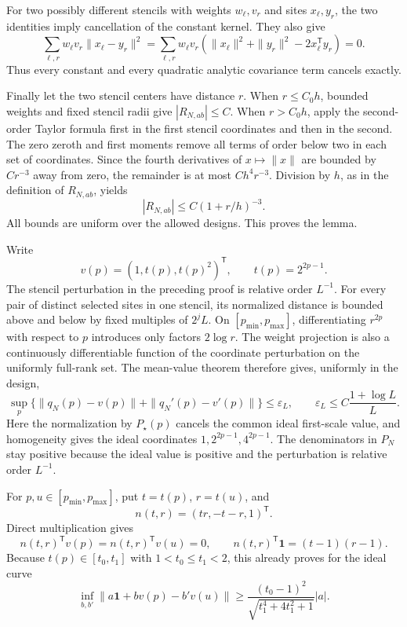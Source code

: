 For two possibly different stencils with weights \(w_\ell,v_r\) and sites \(x_\ell,y_r\), the two identities imply cancellation of the constant kernel.  They also give
\[
 \sum_{\ell,r}w_\ell v_r\|x_\ell-y_r\|^2
 =\sum_{\ell,r}w_\ell v_r
   (\|x_\ell\|^2+\|y_r\|^2-2x_\ell^{\mathsf T}y_r)=0.
\]
Thus every constant and every quadratic analytic covariance term cancels exactly.

Finally let the two stencil centers have distance \(r\).  When \(r\le C_0h\), bounded weights and fixed stencil radii give \(|R_{N,ab}|\le C\).  When \(r>C_0h\), apply the second-order Taylor formula first in the first stencil coordinates and then in the second.  The zero zeroth and first moments remove all terms of order below two in each set of coordinates.  Since the fourth derivatives of \(x\mapsto\|x\|\) are bounded by \(Cr^{-3}\) away from zero, the remainder is at most \(Ch^4r^{-3}\).  Division by \(h\), as in the definition of \(R_{N,ab}\), yields
\[
 |R_{N,ab}|\le C(1+r/h)^{-3}.
\]
All bounds are uniform over the allowed designs.  This proves the lemma.

Write
\[
 v(p)=(1,t(p),t(p)^2)^{\mathsf T},
 \qquad t(p)=2^{2p-1}.
\]
The stencil perturbation in the preceding proof is relative order \(L^{-1}\).  For every pair of distinct selected sites in one stencil, its normalized distance is bounded above and below by fixed multiples of \(2^jL\).  On \([p_{\min},p_{\max}]\), differentiating \(r^{2p}\) with respect to \(p\) introduces only factors \(2\log r\).  The weight projection is also a continuously differentiable function of the coordinate perturbation on the uniformly full-rank set.  The mean-value theorem therefore gives, uniformly in the design,
\[
 \sup_p\bigl\{\|q_N(p)-v(p)\|+\|q_N'(p)-v'(p)\|\bigr\}
 \le \varepsilon_L,
 \qquad
 \varepsilon_L\le C\frac{1+\log L}{L}.
\]
Here the normalization by \(P_\star(p)\) cancels the common ideal first-scale value, and homogeneity gives the ideal coordinates \(1,2^{2p-1},4^{2p-1}\).  The denominators in \(P_N\) stay positive because the ideal value is positive and the perturbation is relative order \(L^{-1}\).

For \(p,u\in[p_{\min},p_{\max}]\), put \(t=t(p)\), \(r=t(u)\), and
\[
 n(t,r)=(tr,-t-r,1)^{\mathsf T}.
\]
Direct multiplication gives
\[
 n(t,r)^{\mathsf T}v(p)=n(t,r)^{\mathsf T}v(u)=0,
 \qquad
 n(t,r)^{\mathsf T}\mathbf 1=(t-1)(r-1).
\]
Because \(t(p)\in[t_0,t_1]\) with \(1<t_0\le t_1<2\), this already proves for the ideal curve
\[
 \inf_{b,b'}\|a\mathbf 1+bv(p)-b'v(u)\|
 \ge
 \frac{(t_0-1)^2}{\sqrt{t_1^4+4t_1^2+1}}|a|.
\]

